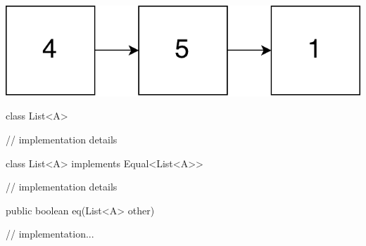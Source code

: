 \documentclass[usenames,dvipsnames,svgnames,table,aspectratio=169,mathserif]{beamer}
\begin{document}
\begin{frame}
\begin{center}
\includegraphics[scale=0.5]{list.pdf}
\end{center}
\end{frame}


\begin{frame}[fragile]
\begin{javacode}
class List<A> {
  // implementation details





}
\end{javacode}
\end{frame}


\begin{frame}[fragile]
\begin{javacode}
class List<A> implements Equal<List<A>> {
  // implementation details

  public boolean eq(List<A> other) {
    // implementation...

  }
}
\end{javacode}
\end{frame}
\end{document}
